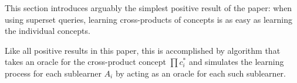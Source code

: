 This section introduces arguably the simplest positive result of the paper: when using superset queries, learning cross-products of concepts is as easy as learning the individual concepts. 

Like all positive results in this paper, this is accomplished by algorithm that takes an oracle for the cross-product concept $\prod c_i^*$ and simulates the learning process for each sublearner $A_i$ by acting as an oracle for each such sublearner. 







